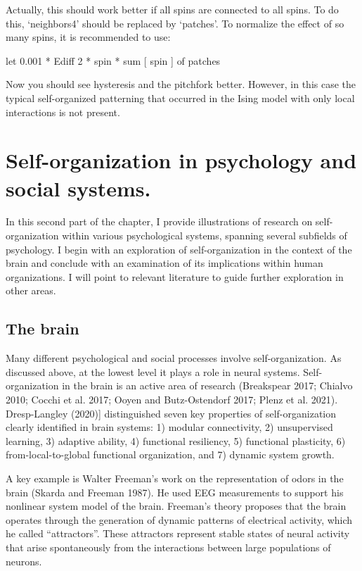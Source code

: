 \documentclass[
  a4paper,
  DIV=11,
  numbers=noendperiod]{scrreprt}
\begin{document}
Actually, this should work better if all spins are connected to all
spins. To do this, `neighbors4' should be replaced by `patches'. To
normalize the effect of so many spins, it is recommended to use:

{let} {0.001} {*} {Ediff} {2} {*} {spin} {* sum} {{[} spin {]}} {of
patches}

Now you should see hysteresis and the pitchfork better. However, in this
case the typical self-organized patterning that occurred in the Ising
model with only local interactions is not present.

\hypertarget{sec-Selforganization-in-psychology-and-social-systems}{%
\section{Self-organization in psychology and social
systems.}\label{sec-Selforganization-in-psychology-and-social-systems}}

In this second part of the chapter, I provide illustrations of research
on self-organization within various psychological systems, spanning
several subfields of psychology. I begin with an exploration of
self-organization in the context of the brain and conclude with an
examination of its implications within human organizations. I will point
to relevant literature to guide further exploration in other areas.

\hypertarget{sec-The-brain}{%
\subsection{The brain}\label{sec-The-brain}}

Many different psychological and social processes involve
self-organization. As discussed above, at the lowest level it plays a
role in neural systems. Self-organization in the brain is an active area
of research (Breakspear 2017; Chialvo 2010; Cocchi et al. 2017; Ooyen
and Butz-Ostendorf 2017; Plenz et al. 2021). Dresp-Langley (2020){]}
distinguished seven key properties of self-organization clearly
identified in brain systems: 1) modular connectivity, 2) unsupervised
learning, 3) adaptive ability, 4) functional resiliency, 5) functional
plasticity, 6) from-local-to-global functional organization, and 7)
dynamic system growth.

A key example is Walter Freeman's work on the representation of odors in
the brain (Skarda and Freeman 1987). He used EEG measurements to support
his nonlinear system model of the brain. Freeman's theory proposes that
the brain operates through the generation of dynamic patterns of
electrical activity, which he called ``attractors''. These attractors
represent stable states of neural activity that arise spontaneously from
the interactions between large populations of neurons.
\end{document}
